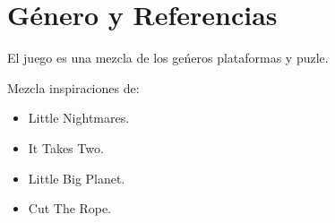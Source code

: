 \documentclass[12pt,twoside,letterpaper]{article}
\begin{document}
\section{Género y Referencias}

El juego es una mezcla de los geńeros plataformas y puzle.

Mezcla inspiraciones de:
\begin{itemize}
    \item Little Nightmares.
    \item It Takes Two.
    \item Little Big Planet.
    \item Cut The Rope.
\end{itemize}
\end{document}
